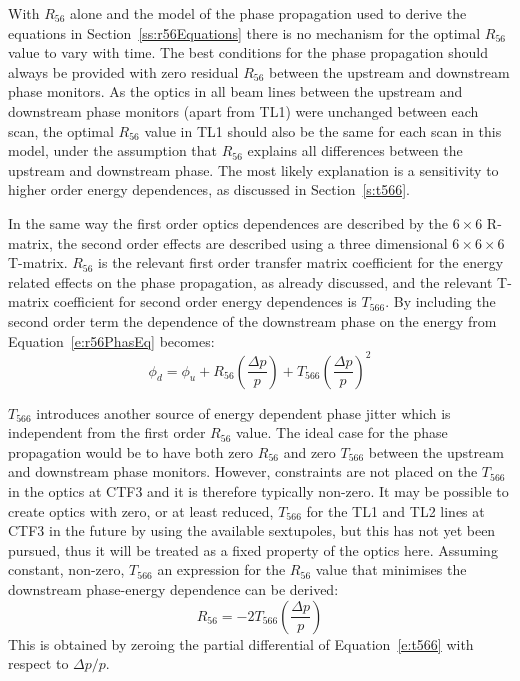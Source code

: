 With \(R_{56}\) alone and the model of the phase propagation used to derive the equations in Section~\ref{ss:r56Equations} there is no mechanism for the optimal \(R_{56}\) value to vary with time. The best conditions for the phase propagation should always be provided with zero residual \(R_{56}\) between the upstream and downstream phase monitors. As the optics in all beam lines between the upstream and downstream phase monitors (apart from TL1) were unchanged between each scan, the optimal \(R_{56}\) value in TL1 should also be the same for each scan in this model, under the assumption that \(R_{56}\) explains all differences between the upstream and downstream phase. The most likely explanation is a sensitivity to higher order energy dependences, as discussed in Section~\ref{s:t566}.


In the same way the first order optics dependences are described by the \(6 \times 6\) R-matrix, the second order effects are described using a three dimensional \(6 \times 6 \times 6\) T-matrix. \(R_{56}\) is the relevant first order transfer matrix coefficient for the energy related effects on the phase propagation, as already discussed, and the relevant T-matrix coefficient for second order energy dependences is \(T_{566}\). By including the second order term the dependence of the downstream phase on the energy from Equation~\ref{e:r56PhasEq} becomes:
\begin{equation}
\phi_d = \phi_u + R_{56}\left(\frac{\Delta p}{p}\right) + T_{566}\left(\frac{\Delta p}{p}\right)^2
\label{e:t566}
\end{equation}

\(T_{566}\) introduces another source of energy dependent phase jitter which is independent from the first order \(R_{56}\) value. The ideal case for the phase propagation would be to have both zero \(R_{56}\) and zero \(T_{566}\) between the upstream and downstream phase monitors. However, constraints are not placed on the \(T_{566}\) in the optics at CTF3 and it is therefore typically non-zero. It may be possible to create optics with zero, or at least reduced, \(T_{566}\) for the TL1 and TL2 lines at CTF3 in the future by using the available sextupoles, but this has not yet been pursued, thus it will be treated as a fixed property of the optics here. Assuming constant, non-zero, \(T_{566}\) an expression for the \(R_{56}\) value that minimises the downstream phase-energy dependence can be derived:
\begin{equation}
R_{56} = -2T_{566} \left(\frac{\Delta p}{p}\right)
\label{e:r56t566dep}
\end{equation}
This is obtained by zeroing the partial differential of Equation~\ref{e:t566} with respect to \(\Delta p/p\).

